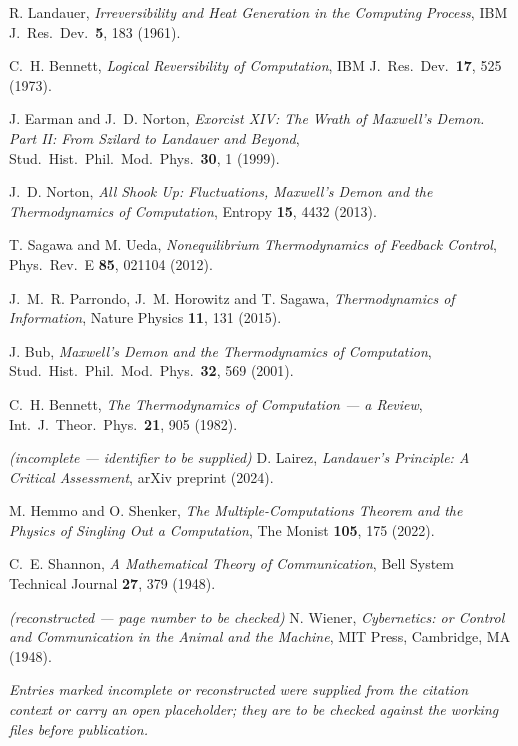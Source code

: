 \begingroup
\small
\begin{description}[leftmargin=3.2em,style=sameline,itemsep=0.3em]

\item[{[B1]}] R. Landauer, \emph{Irreversibility and Heat Generation in the
Computing Process}, IBM J.\ Res.\ Dev.\ \textbf{5}, 183 (1961).

\item[{[B2]}] C.~H. Bennett, \emph{Logical Reversibility of Computation}, IBM J.\
Res.\ Dev.\ \textbf{17}, 525 (1973).

\item[{[B3]}] J. Earman and J.~D. Norton, \emph{Exorcist XIV: The Wrath of
Maxwell's Demon. Part II: From Szilard to Landauer and Beyond}, Stud.\ Hist.\
Phil.\ Mod.\ Phys.\ \textbf{30}, 1 (1999).

\item[{[B4]}] J.~D. Norton, \emph{All Shook Up: Fluctuations, Maxwell's Demon and
the Thermodynamics of Computation}, Entropy \textbf{15}, 4432 (2013).

\item[{[B5]}] T. Sagawa and M. Ueda, \emph{Nonequilibrium Thermodynamics of
Feedback Control}, Phys.\ Rev.\ E \textbf{85}, 021104 (2012).

\item[{[B6]}] J.~M.~R. Parrondo, J.~M. Horowitz and T. Sagawa,
\emph{Thermodynamics of Information}, Nature Physics \textbf{11}, 131 (2015).

\item[{[B7]}] J. Bub, \emph{Maxwell's Demon and the Thermodynamics of
Computation}, Stud.\ Hist.\ Phil.\ Mod.\ Phys.\ \textbf{32}, 569 (2001).

\item[{[B8]}] C.~H. Bennett, \emph{The Thermodynamics of Computation --- a
Review}, Int.\ J.\ Theor.\ Phys.\ \textbf{21}, 905 (1982).

\item[{[B9]}] \emph{(incomplete --- identifier to be supplied)} D. Lairez,
\emph{Landauer's Principle: A Critical Assessment}, arXiv preprint (2024).

\item[{[B10]}] M. Hemmo and O. Shenker, \emph{The Multiple-Computations Theorem
and the Physics of Singling Out a Computation}, The Monist \textbf{105}, 175
(2022).

\item[{[B11]}] C.~E. Shannon, \emph{A Mathematical Theory of Communication}, Bell
System Technical Journal \textbf{27}, 379 (1948).

\item[{[B12]}] \emph{(reconstructed --- page number to be checked)} N. Wiener,
\emph{Cybernetics: or Control and Communication in the Animal and the Machine},
MIT Press, Cambridge, MA (1948).

\end{description}
\endgroup

\vspace{1em}
\noindent
{\small\itshape Entries marked \emph{incomplete} or \emph{reconstructed} were
supplied from the citation context or carry an open placeholder; they are to be
checked against the working files before publication.}
